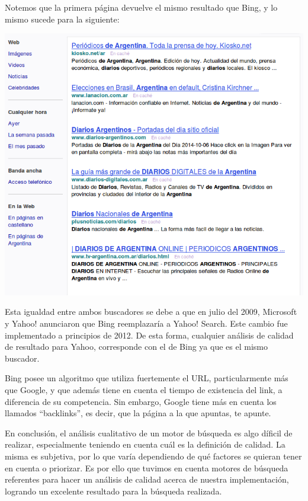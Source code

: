 Notemos que la primera página devuelve el mismo resultado que Bing, y lo mismo sucede para la siguiente:

	\par 
	\begin{center}
		\includegraphics[scale=0.5]{./img/segundapaginayahoo.png}
	\end{center}
	\par

Esta igualdad entre ambos buscadores se debe a que en julio del 2009, Microsoft y Yahoo! anunciaron que Bing reemplazaría a Yahoo! Search. Este cambio fue implementado a principios de 2012. De esta forma, cualquier análisis de calidad de resultado para Yahoo, corresponde con el de Bing ya que es el mismo buscador.
\par 
Bing posee un algoritmo que utiliza fuertemente el URL, particularmente más que Google, y que además tiene en cuenta el tiempo de existencia del link, a diferencia de su competencia. Sin embargo, Google tiene más en cuenta los llamados ``backlinks'', es decir, que la página a la que apuntas, te apunte. 
\par 
En conclusión, el análisis cualitativo de un motor de búsqueda es algo díficil de realizar, especialmente teniendo en cuenta cuál es la definición de calidad. La misma es subjetiva, por lo que varía dependiendo de qué factores se quieran tener en cuenta o priorizar. Es por ello que tuvimos en cuenta motores de búsqueda referentes para hacer un análisis de calidad acerca de nuestra implementación, logrando un excelente resultado para la búsqueda realizada.
	
